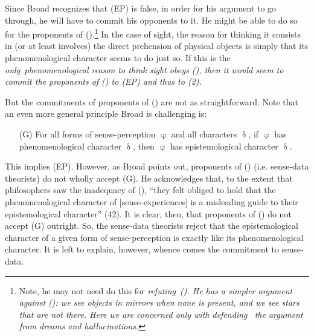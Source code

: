 Since Broad recognizes that (EP) is false, in order for his argument to go through, he will have to commit his opponents to it. He might be able to do so for the proponents of (\PRO).\footnote{Note, he may not need do this for \em refuting\em\ (\PRO). He has a simpler argument against (\PRO): we see objects in mirrors when none is present, and we see stars that are not there. Here we are concerned only with defending \ the argument from dreams and hallucinations.} In the case of sight, the reason for thinking it consists in (or at least involves) the direct prehension of physical objects is simply that its phenomenological character seems to do just so. If this is the \em only\em\ phenomenological reason to think sight obeys (\PRO), then it would seem to commit the proponents of (\PRO) to (EP) and thus to (2).

But the commitments of proponents of (\PRS) are not as straightforward. Note that an even more general principle Broad is challenging is:
\begin{enumerate}

\item[(G)]For all forms of sense-perception $\upvarphi$ and all characters $\updelta$, if $\upvarphi$ has phenomenological character $\updelta$, then $\upvarphi$ has epistemological character $\updelta$.

\end{enumerate}
This implies (EP). However, as Broad points out, proponents of (\PRS) (i.e. sense-data theorists) do not wholly accept (G). He acknowledges that, to the extent that philosophers saw the inadequacy of (\PRO), ``they felt obliged to hold that the phenomenological character of [sense-experiences] is a misleading guide to their epistemological character'' (42). It is clear, then, that proponents of (\PRS) do not accept (G) outright. So, the sense-data theorists reject that the epistemological character of a given form of sense-perception is exactly like its phenomenological character. It is left to explain, however, whence comes the commitment to sense-data.

